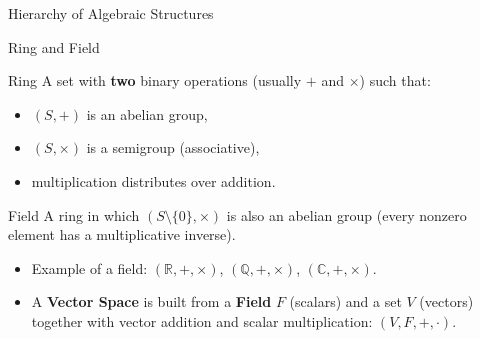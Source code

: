 \documentclass[9pt,aspectratio=169]{beamer}
\begin{document}
\begin{frame}{Hierarchy of Algebraic Structures}
\centering
{}
\end{frame}

\begin{frame}{Ring and Field}
\begin{block}{Ring}
A set with \textbf{two} binary operations (usually $+$ and $\times$) such that:
\begin{itemize}
\item $(S,+)$ is an abelian group,
\item $(S,\times)$ is a semigroup (associative),
\item multiplication distributes over addition.
\end{itemize}
\end{block}
\begin{block}{Field}
A ring in which $(S\setminus\{0\}, \times)$ is also an abelian group (every nonzero element has a multiplicative inverse).
\end{block}
\begin{itemize}
\item Example of a field: $(\mathbb{R}, +, \times)$, $(\mathbb{Q}, +,\times)$, $(\mathbb{C}, +, \times)$.
\item A \textbf{Vector Space} is built from a \textbf{Field} $F$ (scalars) and a set $V$ (vectors) together with vector addition and scalar multiplication: $(V, F, +, \cdot)$.
\end{itemize}
\end{frame}
\end{document}
